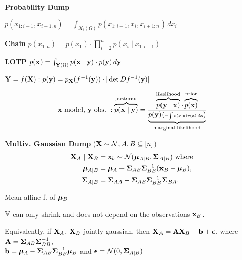 \begin{colored}
    \textbf{Probability Dump}
    
    \begin{itemize*}
        \item \(p(x_{1:i-1}, x_{i+1,n}) = \int_{X_i(\Omega)}p(x_{1:i-1}, x_i, x_{i+1:n}) \,dx_i\)
        \item \textbf{Chain} \(p(x_{1:n}) = p(x_1)\cdot \prod_{i=2}^n p(x_i \mid x_{1:i-1})\) \\
        \item \textbf{LOTP} \(p(\vb{x}) = \int_{\vb{Y}(\Omega)} p(\vb{x} \mid \vb{y}) \cdot p(\vb{y}) \, d\vb{y}\) \\
        \item \(\vb{Y} = f(\vb{X}) : p(\vb{y}) = p_{\vb{X}}(f^{-1}(\vb{y})) \cdot |\det Df^{-1}(\vb{y})|\)
    \end{itemize*}
\end{colored}

\vspace{-10pt}
\[\x \ \text{model}, \, \y \ \text{obs.} \ : \overbrace{p(\x \mid \y)}^{\text{posterior}} = \frac{\overbrace{p(\y \mid \x)}^{\text{likelihood}} \cdot \overbrace{p(\x)}^{\text{prior}}}{\underbrace{p(\y) ({\scriptscriptstyle = \int p(\y \mid \x) p(\x) \, d\x})}_{\text{marginal likelihood}}}\]

\begin{colored}
    \textbf{Multiv. Gaussian Dump} (\(\vb{X} \sim \operatorname{\mathcal{N}}, A, B \subseteq [n]\))
    \begin{align*}
        \vb{X}_A \mid \vb{X}_B &= \vb{x}_b \sim \operatorname{\mathcal{N}} (\vb*{\mu}_{A \mid B}, \vb*{\Sigma}_{A \mid B}) \ \text{where} \\
        \vb*{\mu}_{A \mid B} &= \vb*{\mu}_A + \vb*{\Sigma}_{AB}\vb*{\Sigma}_{BB}^{-1}(\vb{x}_B - \vb*{\mu}_B),\\
        \vb*{\Sigma}_{A \mid B} &= \vb*{\Sigma}_{AA} - \vb*{\Sigma}_{AB}\vb*{\Sigma}_{BB}^{-1}\vb*{\Sigma}_{BA}.
    \end{align*}

    \begin{itemize*}
        \item Mean affine f. of \(\vb*{\mu}_B\)
        \item \(\operatorname{\mathbb{V}}\) can only shrink and does not depend on the observations \(\vb{x}_B\).
    \end{itemize*}

    Equivalently, if \(\vb{X}_A\), \(\vb{X}_B\) jointly gaussian, then
        \(\vb{X}_A = \vb{A}\vb{X}_B + \vb{b} + \vb*{\epsilon}\), where
        \(\vb{A} = \vb*{\Sigma}_{AB}\vb*{\Sigma}_{BB}^{-1}\), \\
        \(\vb{b} = \vb*{\mu}_A - \vb*{\Sigma}_{AB}\vb*{\Sigma}_{BB}^{-1}\vb*{\mu}_B\) and 
        \(\vb*{\epsilon} = \operatorname{\mathcal{N}}(0, \vb*{\Sigma}_{A \mid B})\)
\end{colored}

